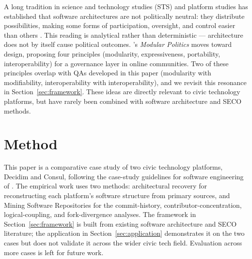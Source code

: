 \documentclass[11pt,a4paper]{article}
\begin{document}
A long tradition in science and technology studies (STS) and platform studies has established that software architectures are not politically neutral: they distribute possibilities, making some forms of participation, oversight, and control easier than others \citep{winner1980artifacts, lessig2006code, denardis2014global, schneider2024governable}. This reading is analytical rather than deterministic --- architecture does not by itself cause political outcomes. \citet{schneider2021modular}'s \emph{Modular Politics} moves toward design, proposing four principles (modularity, expressiveness, portability, interoperability) for a governance layer in online communities. Two of these principles overlap with QAs developed in this paper (modularity with modifiability, interoperability with interoperability), and we revisit this resonance in Section~\ref{sec:framework}. These ideas are directly relevant to civic technology platforms, but have rarely been combined with software architecture and SECO methods.

\section{Method}\label{sec:method}

This paper is a comparative case study of two civic technology platforms, Decidim and Consul, following the case-study guidelines for software engineering of \citet{runeson2009guidelines}. The empirical work uses two methods: architectural recovery \citep{ducasse2009software, garcia2013comparative} for reconstructing each platform's software structure from primary sources, and Mining Software Repositories \citep{hassan2008road} for the commit-history, contributor-concentration, logical-coupling, and fork-divergence analyses. The framework in Section~\ref{sec:framework} is built from existing software architecture and SECO literature; the application in Section~\ref{sec:application} demonstrates it on the two cases but does not validate it across the wider civic tech field. Evaluation across more cases is left for future work.
\end{document}
